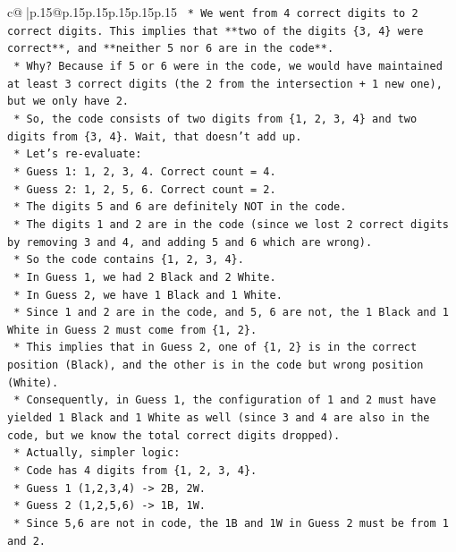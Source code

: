 \documentclass{article}
\begin{document}
{\begin{supertabular}{c@{$\;$}|p{.15\linewidth}@{}p{.15\linewidth}p{.15\linewidth}p{.15\linewidth}p{.15\linewidth}p{.15\linewidth}}
{{{\texttt{    *   We went from 4 correct digits to 2 correct digits. This implies that **two of the digits \{3, 4\} were correct**, and **neither 5 nor 6 are in the code**.} \\
\texttt{    *   Why? Because if 5 or 6 were in the code, we would have maintained at least 3 correct digits (the 2 from the intersection + 1 new one), but we only have 2.} \\
\texttt{    *   So, the code consists of two digits from \{1, 2, 3, 4\} and two digits from \{3, 4\}. Wait, that doesn't add up.} \\
\texttt{    *   Let's re{-}evaluate:} \\
\texttt{        *   Guess 1: 1, 2, 3, 4. Correct count = 4.} \\
\texttt{        *   Guess 2: 1, 2, 5, 6. Correct count = 2.} \\
\texttt{        *   The digits 5 and 6 are definitely NOT in the code.} \\
\texttt{        *   The digits 1 and 2 are in the code (since we lost 2 correct digits by removing 3 and 4, and adding 5 and 6 which are wrong).} \\
\texttt{        *   So the code contains \{1, 2, 3, 4\}.} \\
\texttt{        *   In Guess 1, we had 2 Black and 2 White.} \\
\texttt{        *   In Guess 2, we have 1 Black and 1 White.} \\
\texttt{        *   Since 1 and 2 are in the code, and 5, 6 are not, the 1 Black and 1 White in Guess 2 must come from \{1, 2\}.} \\
\texttt{        *   This implies that in Guess 2, one of \{1, 2\} is in the correct position (Black), and the other is in the code but wrong position (White).} \\
\texttt{        *   Consequently, in Guess 1, the configuration of 1 and 2 must have yielded 1 Black and 1 White as well (since 3 and 4 are also in the code, but we know the total correct digits dropped).} \\
\texttt{        *   Actually, simpler logic:} \\
\texttt{            *   Code has 4 digits from \{1, 2, 3, 4\}.} \\
\texttt{            *   Guess 1 (1,2,3,4) {-}> 2B, 2W.} \\
\texttt{            *   Guess 2 (1,2,5,6) {-}> 1B, 1W.} \\
\texttt{            *   Since 5,6 are not in code, the 1B and 1W in Guess 2 must be from 1 and 2.} \\
}}}
\end{supertabular}}
\end{document}
